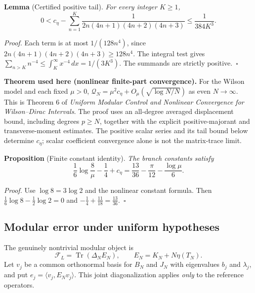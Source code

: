 \documentclass[
  10pt,
  a4paper,
]{article}
\begin{document}
\label{lem:ctail}
\textbf{Lemma} (Certified positive tail). \emph{For every integer \(K\ge1\), \begin{equation}
\label{eq:ctail}
0<c_\eta-\sum_{n=1}^K\frac{1}{2n(4n+1)(4n+2)(4n+3)}\le\frac{1}{384K^3}.
\end{equation}}

\emph{Proof.} Each term is at most \(1/(128n^4)\), since \(2n(4n+1)(4n+2)(4n+3)\ge128n^4\). The integral test gives \(\sum_{n>K}n^{-4}\le\int_K^\infty x^{-4}\,dx=1/(3K^3)\). The summands are strictly positive.~\(\square\)

\textbf{Theorem used here (nonlinear finite-part convergence).} For the Wilson model and each fixed \(\mu>0\), \(\mathcal Q_N=\mu^2c_\eta+O_\mu(\sqrt{\log N/N})\) as even \(N\to\infty\). This is Theorem 6 of \emph{Uniform Modular Control and Nonlinear Convergence for Wilson--Dirac Intervals}. The proof uses an all-degree averaged displacement bound, including degrees \(p\ge N\), together with the explicit positive-majorant and transverse-moment estimates. The positive scalar series and its tail bound below determine \(c_\eta\); scalar coefficient convergence alone is not the matrix-trace limit.

\label{prop:constant}
\textbf{Proposition} (Finite constant identity). \emph{The branch constants satisfy \begin{equation}
\label{eq:constantreconcile}
\frac16\log\frac8\mu-\frac14+c_\eta
=\frac{13}{36}-\frac\pi{12}-\frac{\log\mu}{6}.
\end{equation}}

\emph{Proof.} Use \(\log 8=3\log2\) and the nonlinear constant formula. Then \(\frac16\log 8-\frac12\log2=0\) and \(-\frac14+\frac{11}{18}=\frac{13}{36}\).~\(\square\)

\subsection{Modular error under uniform hypotheses}\label{modular-error-under-uniform-hypotheses}

The genuinely nontrivial modular object is \begin{equation}
\label{eq:modular}
\mathcal F_L=\operatorname{Tr}(\Delta_NE_N),\qquad E_N=K_N+N\eta(T_N).
\end{equation} Let \(v_j\) be a common orthonormal basis for \(B_N\) and \(J_N\) with eigenvalues \(b_j\) and \(\lambda_j\), and put \(e_j=\langle v_j,E_Nv_j\rangle\). This joint diagonalization applies \emph{only} to the reference operators.
\end{document}
